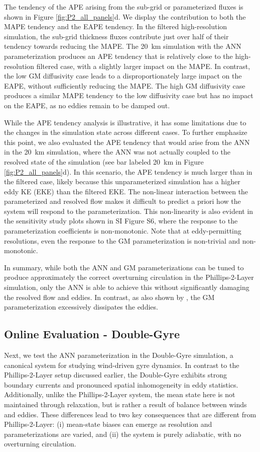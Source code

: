 \documentclass[draft]{agujournal2019}
\begin{document}
The tendency of the APE arising from the sub-grid or parameterized fluxes is shown in Figure \ref{fig:P2_all_panels}d. We display the contribution to both the MAPE tendency and the EAPE tendency. In the filtered high-resolution simulation, the sub-grid thickness fluxes contribute just over half of their tendency towards reducing the MAPE.
The 20~km simulation with the ANN parameterization produces an APE tendency that is relatively close to the high-resolution filtered case, with a slightly larger impact on the MAPE. 
In contrast, the low GM diffusivity case leads to a disproportionately large impact on the EAPE, without sufficiently reducing the MAPE. The high GM diffusivity case produces a similar MAPE tendency to the low diffusivity case but has no impact on the EAPE, as no eddies remain to be damped out. 


While the APE tendency analysis is illustrative, it has some limitations due to the changes in the simulation state across different cases. To further emphasize this point, we also evaluated the APE tendency that would arise from the ANN in the 20~km simulation, where the ANN was not actually coupled to the resolved state of the simulation (see bar labeled 20~km in Figure \ref{fig:P2_all_panels}d). In this scenario, the APE tendency is much larger than in the filtered case, likely because this unparameterized simulation has a higher eddy KE (EKE) than the filtered EKE.
The non-linear interaction between the parameterized and resolved flow makes it difficult to predict a priori how the system will respond to the parameterization. This non-linearity is also evident in the sensitivity study plots shown in SI Figure S6, where the response to the parameterization coefficients is non-monotonic. Note that at eddy-permitting resolutions, even the response to the GM parameterization is non-trivial and non-monotonic.


In summary, while both the ANN and GM parameterizations can be tuned to produce approximately the correct overturning circulation in the Phillips-2-Layer simulation, only the ANN is able to achieve this without significantly damaging the resolved flow and eddies. In contrast, as also shown by \cite{hallberg2013using}, the GM parameterization excessively dissipates the eddies.

\subsection{Online Evaluation - Double-Gyre}
Next, we test the ANN parameterization in the Double-Gyre simulation, a canonical system for studying wind-driven gyre dynamics. In contrast to the Phillips-2-Layer setup discussed earlier, the Double-Gyre exhibits strong boundary currents and pronounced spatial inhomogeneity in eddy statistics. Additionally, unlike the Phillips-2-Layer system, the mean state here is not maintained through relaxation, but is rather a result of balance between winds and eddies. These differences lead to two key consequences that are different from Phillips-2-Layer: (i) mean-state biases can emerge as resolution and parameterizations are varied, and (ii) the system is purely adiabatic, with no overturning circulation.
\end{document}
